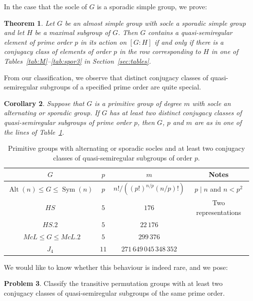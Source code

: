 \documentclass{article}
\newtheorem{thm}{Theorem}[section]
\newtheorem{cor}[thm]{Corollary}
\theoremstyle{remark}
\theoremstyle{definition}
\newtheorem{problem}[thm]{Problem}
\DeclareMathOperator{\Alt}{Alt}
\DeclareMathOperator{\Sym}{Sym}
\newcommand{\qsr}{quasi-semiregular}
\newcommand{\qsre}{quasi-semiregular element}
\begin{document}
In the case that the socle of $G$ is a sporadic simple group, we prove:

\begin{thm}
\label{thmintro: sporadic}
    Let $G$ be an almost simple group with socle a sporadic simple group and let $H$ be a maximal subgroup of $G$. Then $G$ contains a {\qsre} of prime order $p$ in its action on $[G:H]$ if and only if there is a conjugacy class of elements of order $p$ in the row corresponding to $H$ in one of Tables~\ref{tab:M}--\ref{tab:spor3} in Section~\ref{sec:tables}.
\end{thm}

From our classification, we observe that distinct conjugacy classes of {\qsr} subgroups of a  specified prime order are  quite special.

\begin{cor}
\label{cor: more than one class of qsrs}
    Suppose that $ G$ is a primitive group of degree $m$ with socle an alternating or sporadic group. If $G$ has at least two distinct conjugacy classes of {\qsr} subgroups of prime order $p$, then $G$, $p$ and $m$ are as in one of the lines of Table~\ref{tab: >1 qsr classes}.
\end{cor}

    \begin{table}
        \centering
        \begin{tabular}{c|c|c|c}
            $G$ & $p$ & $m$ & Notes\\ \hline
             $\Alt(n) \leqslant G \leqslant \Sym(n)$ & $p$ & ${n!}/({(p!)^{n/p}(n/p)!})$ & $p\mid n$ and $n < p^2$ \\
             $HS$ & $5$ & $176$ & Two representations 
             \\
             $HS.2$ & $5$ & $22\, 176$ \\\
             $McL \leqslant  G \leqslant McL.2$ & $5$ & $299 \,376$ \\
             $J_4$ & $11$ & $271\, 649\, 045\, 348\, 352$ \\
        \end{tabular}
        \caption{Primitive groups with alternating or sporadic socles and at least two conjugacy classes of {\qsr} subgroups of order $p$.}
        \label{tab: >1 qsr classes}
    \end{table}

We would like to know whether this behaviour is indeed rare, and we pose:

\begin{problem}
    Classify the transitive permutation groups with at least two conjugacy classes of {\qsr} subgroups of   the same prime order.
\end{problem}
\end{document}
